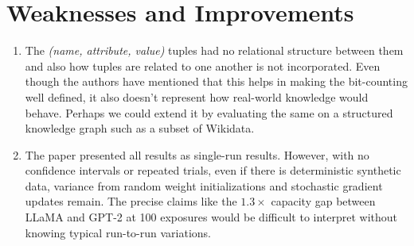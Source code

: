 \documentclass{article}
\begin{document}
\begin{enumerate}[leftmargin=*]
\end{enumerate}

\section{Weaknesses and Improvements}

\begin{enumerate}[leftmargin=*]

  \item 
  The \textit{(name, attribute, value)} tuples had no relational structure between them and also how tuples are related to one another is not incorporated. Even though the authors have mentioned that this helps in making the bit-counting well defined, it also doesn't represent how real-world knowledge would behave. Perhaps we could extend it by evaluating the same on a structured knowledge graph such as a subset of Wikidata.

  \item 
  The paper presented all results as single-run results. However, with no confidence intervals or repeated trials, even if there is deterministic synthetic data, variance from random weight initializations and stochastic gradient updates remain. The precise claims like the $1.3\times$ capacity gap between LLaMA \cite{touvron2023llama} and GPT-2 \cite{radford2019gpt2} at 100 exposures would be difficult to interpret without knowing typical run-to-run variations.



\end{enumerate}
\end{document}

